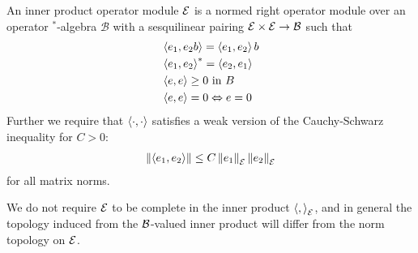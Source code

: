 \begin{definition}
	An inner product operator module $\mathcal{E}$ is a normed right operator module over an operator $^*$-algebra $\mathcal{B}$ with a sesquilinear pairing $\mathcal{E}\times \mathcal{E}\to \mathcal{B}$ such that 
	\begin{align*}
	&\left \langle e_1,e_2b \right \rangle=\left \langle e_1,e_2 \right \rangle b \\
	&\left \langle e_1,e_2 \right \rangle^*=\left \langle e_2,e_1 \right \rangle \\
	&\left \langle e,e \right \rangle\geq 0 \text{ in } B\\
	&\left \langle e,e \right \rangle=0 \Leftrightarrow e=0
	\end{align*}
	Further we require that $\left \langle \cdot,\cdot \right \rangle$ satisfies a weak version of the Cauchy-Schwarz inequality for $C>0$: \begin{align*} \left \Vert \left \langle e_1,e_2 \right \rangle \right \Vert\leq C \left \Vert e_1 \right \Vert_{\mathcal{E}}\left \Vert e_2 \right \Vert_{\mathcal{E}} \end{align*} for all matrix norms. 
\end{definition}
\begin{remark}
	We do not require $\mathcal{E}$ to be complete in the inner product $\left \langle , \right \rangle_{\mathcal{E}}$, and in general the topology induced from the $\mathcal{B}$-valued inner product will differ from the norm topology on $\mathcal{E}$. 
\end{remark}

